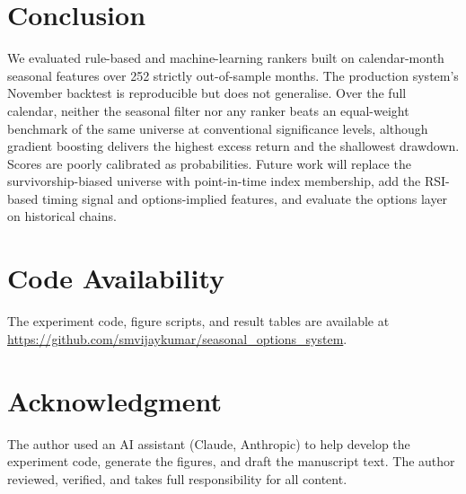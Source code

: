 \documentclass[conference]{IEEEtran}
\begin{document}
\section{Conclusion}
We evaluated rule-based and machine-learning rankers built on calendar-month seasonal features over 252 strictly out-of-sample months. The production system's November backtest is reproducible but does not generalise. Over the full calendar, neither the seasonal filter nor any ranker beats an equal-weight benchmark of the same universe at conventional significance levels, although gradient boosting delivers the highest excess return and the shallowest drawdown. Scores are poorly calibrated as probabilities. Future work will replace the survivorship-biased universe with point-in-time index membership, add the RSI-based timing signal and options-implied features, and evaluate the options layer on historical chains.

\section*{Code Availability}
The experiment code, figure scripts, and result tables are available at \url{https://github.com/smvijaykumar/seasonal_options_system}.

\section*{Acknowledgment}
The author used an AI assistant (Claude, Anthropic) to help develop the experiment code, generate the figures, and draft the manuscript text. The author reviewed, verified, and takes full responsibility for all content.



\end{document}
